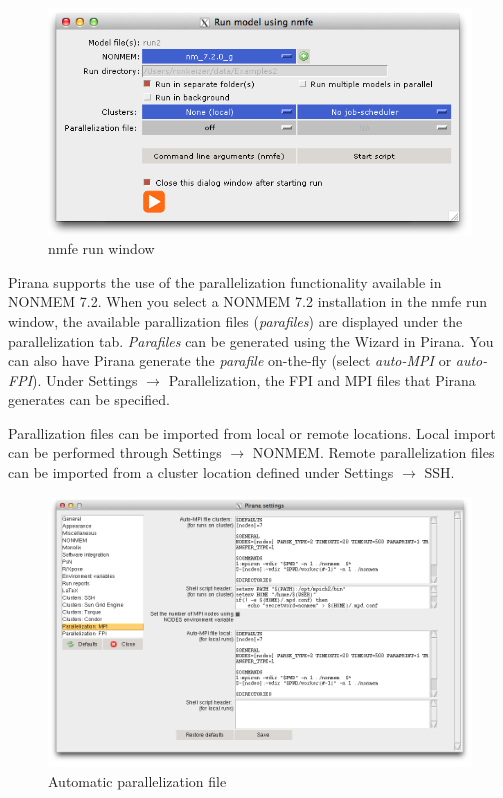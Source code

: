 {{\begin{figure}[h] \centering
    \includegraphics[scale=0.5]{images/nmfe_run.png}
    \caption{nmfe run window}
\end{figure}

\noindent Pirana supports the use of the parallelization functionality available
in NONMEM 7.2. When you select a NONMEM 7.2 installation in the nmfe
run window, the available parallization files (\textit{parafiles}) are displayed under the parallelization tab. \textit{Parafiles} can be generated using the Wizard in Pirana. You can also have Pirana generate the \textit{parafile} on-the-fly (select \textit{auto-MPI} or \textit{auto-FPI}). Under Settings $\rightarrow$ Parallelization, the FPI and MPI files that Pirana generates can be specified.

\vspace{5pt}

\noindent Parallization files can be imported from local or remote locations. Local import can be performed through Settings $\rightarrow$ NONMEM. Remote parallelization files can be imported from a cluster location defined under Settings $\rightarrow$ SSH.

\begin{figure}[H] \centering
    \includegraphics[scale=0.27]{images/settingsparallization.png}
    \caption{Automatic parallelization file}
\end{figure}

}}
